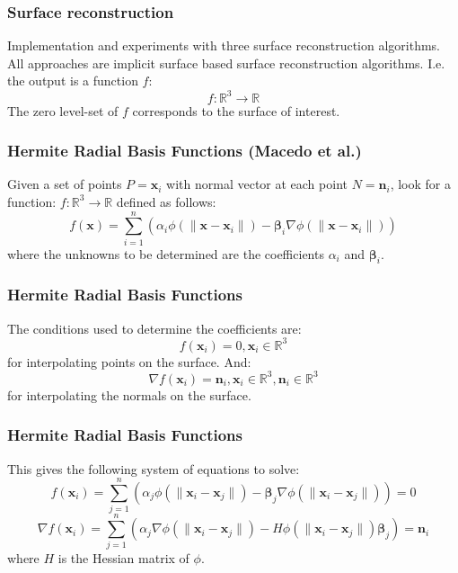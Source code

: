 \documentclass{beamer}
\def\x{\mathbf{x}}
\def\R{\mathbb{R}}
\def\n{\mathbf{n}}
\def\bbeta{\boldsymbol\beta}
\begin{document}
\begin{frame}
	\frametitle{Surface reconstruction}
	\Large
	Implementation and experiments with three surface reconstruction algorithms.\\
	All approaches are implicit surface based surface reconstruction algorithms. I.e. the output is a function $f$:\\
	\[f: \R^3 \rightarrow \R\]
	The zero level-set of $f$ corresponds to the surface of interest.
\end{frame}


\begin{frame}
	\frametitle{Hermite Radial Basis Functions (Macedo et al.)}
\Large
Given a set of points $P = {\x_i}$ with normal vector at each point $N = {\n_i}$, 
look for a function: $f : \R^3 \to \R$ defined as follows:
\[
f(\x)=\sum_{i=1}^n(\alpha_i\phi(\|\x-\x_i\|)-\bbeta_i\nabla\phi(\|\x-\x_i\|))
\]
where the unknowns to be determined are the coefficients $\alpha_i$ and $\bbeta_i$.

\end{frame}


\begin{frame}
\frametitle{Hermite Radial Basis Functions}
\Large
The conditions used to determine the coefficients are: \[f(\x_i) = 0, \x_i \in \R^3\]
for interpolating points on the surface. And: \[\nabla f(\x_i)=\n_i, \x_i \in \R^3, \n_i \in \R^3\]
for interpolating the normals on the surface.
\end{frame}


\begin{frame}
\frametitle{Hermite Radial Basis Functions}
\Large
This gives the following system of equations to solve:
\[f(\x_i)=\sum_{j=1}^n(\alpha_j\phi(\|\x_i-\x_j\|)-\bbeta_j\nabla\phi(\|\x_i-\x_j\|))=0\]
\[\nabla f(\x_i)=\sum_{j=1}^n(\alpha_j\nabla\phi(\|\x_i-\x_j\|)-H\phi(\|\x_i-\x_j\|)\bbeta_j)=\n_i\]
where $H$ is the Hessian matrix of $\phi$.
\end{frame}
\end{document}
